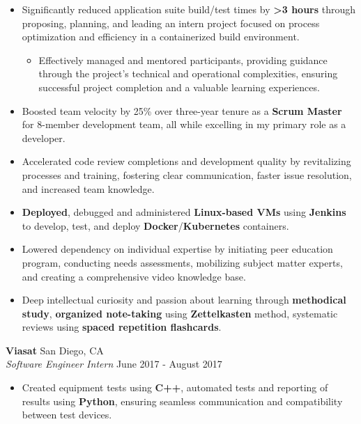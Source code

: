 \documentclass[a4paper]{article}
\begin{document}
\begin{itemize}
\begin{itemize}
        \end{itemize}
	\item Significantly reduced application suite build/test times by \textbf{>3 hours} through proposing, planning, and leading an intern project focused on process optimization and efficiency in a containerized build environment.
    \begin{itemize}
	    \item Effectively managed and mentored participants, providing guidance through the project's technical and operational complexities, ensuring successful project completion and a valuable learning experiences.
    \end{itemize}
	\item Boosted team velocity by 25\% over three-year tenure as a \textbf{Scrum Master} for 8-member development team, all while excelling in my primary role as a developer.
	\item Accelerated code review completions and development quality by revitalizing processes and training, fostering clear communication, faster issue resolution, and increased team knowledge.
	\item \textbf{Deployed}, debugged and administered \textbf{Linux-based VMs} using \textbf{Jenkins} to develop, test, and deploy \textbf{Docker}/\textbf{Kubernetes} containers.
	\item Lowered dependency on individual expertise by initiating peer education program, conducting needs assessments, mobilizing subject matter experts, and creating a comprehensive video knowledge base.
	\item Deep intellectual curiosity and passion about learning through \textbf{methodical study}, \textbf{organized note-taking} using \textbf{Zettelkasten} method, systematic reviews using \textbf{spaced repetition flashcards}.
\end{itemize}

\vspace{-1mm}
\textbf{Viasat} \hfill San Diego, CA\\
\textit{Software Engineer Intern} \hfill June 2017 - August 2017\\
\vspace{-1mm}
\begin{itemize} \itemsep 1pt
    \item Created equipment tests using \textbf{C++}, automated tests and reporting of results using \textbf{Python}, ensuring seamless communication and compatibility between test devices.
\end{itemize}
\end{document}
